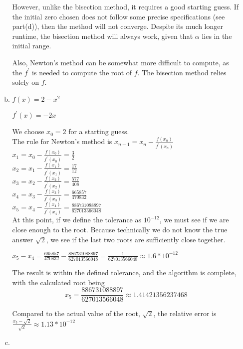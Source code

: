 \documentclass[11pt]{article}
\begin{document}
\begin{enumerate}
\begin{enumerate}[(a)]
		However, unlike the bisection method, it requires a good starting guess. If
		the initial zero chosen does not follow some precise specifications (see part(d)), then the method will not converge. Despite
		its much longer runtime, the bisection method will always work, given that $\alpha$ lies in the initial range.

		Also, Newton's method can be somewhat more difficult to compute, as the $f^{'}$ is needed to compute the root of $f$. The
		bisection method relies solely on $f$. \\

		\item $f(x) = 2-x^2$

		$f^{'}(x) = -2x$

		We choose $x_0=2$ for a starting guess. \\

		The rule for Newton's method is $x_{n+1} = x_n-\frac{f(x_n)}{f^{'}(x_n)}$ \\

		$x_1 = x_0 - \frac{f(x_0)}{f^{'}(x_0)} = \frac{3}{2}$ \\

		$x_2 = x_1 - \frac{f(x_1)}{f^{'}(x_1)} = \frac{17}{12}$ \\

		$x_3 = x_2 - \frac{f(x_2)}{f^{'}(x_2)} = \frac{577}{408}$ \\

		$x_4 = x_3 - \frac{f(x_3)}{f^{'}(x_3)} = \frac{665857}{470832}$ \\

		$x_5 = x_4 - \frac{f(x_4)}{f^{'}(x_4)} = \frac{886731088897}{627013566048}$ \\

		At this point, if we define the tolerance as $10^{-12}$, we must see if we are close enough to the root. Because technically
		we do not know the true answer $\sqrt{2}$, we see if the last two roots are sufficiently close together.

		$x_5 - x_4 = \frac{665857}{470832} - \frac{886731088897}{627013566048} = \frac{1}{627013566048} \approx 1.6*10^{-12}$

		The result is within the defined tolerance, and the algorithm is complete, with the calculated root being
		$$x_5 = \frac{886731088897}{627013566048} \approx 1.41421356237468$$

		Compared to the actual value of the root, $\sqrt{2}$, the relative error is
		$\frac{x_5 - \sqrt{2}}{\sqrt{2}} \approx 1.13*10^{-12}$ \\

		\item

	\end{enumerate}

\end{enumerate}
\end{document}
